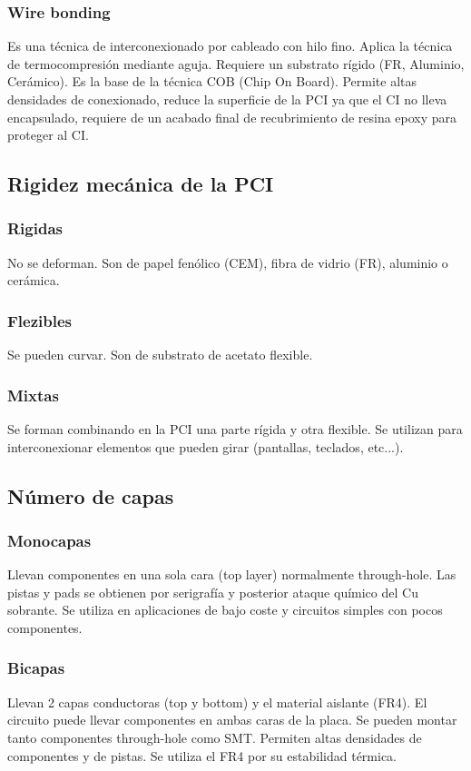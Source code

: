 \subsubsection{Wire bonding}
Es una técnica de interconexionado por cableado con hilo fino. Aplica la técnica de termocompresión mediante aguja. Requiere un substrato rígido (FR, Aluminio, Cerámico). Es la base de la técnica COB (Chip On Board). Permite altas densidades de conexionado, reduce la superficie de la PCI ya que el CI no lleva encapsulado, requiere de un acabado final de recubrimiento de resina epoxy para proteger al CI.

\subsection{Rigidez mecánica de la PCI}
\subsubsection{Rigidas}
No se deforman. Son de papel fenólico (CEM), fibra de vidrio (FR), aluminio o cerámica.

\subsubsection{Flezibles}
Se pueden curvar. Son de substrato de acetato flexible.

\subsubsection{Mixtas}
Se forman combinando en la PCI una parte rígida y otra flexible. Se utilizan para interconexionar elementos que pueden girar (pantallas, teclados, etc...).

\subsection{Número de capas}
\subsubsection{Monocapas}
Llevan componentes en una sola cara (top layer) normalmente through-hole. Las pistas y pads se obtienen por serigrafía y posterior ataque químico del Cu sobrante. Se utiliza en aplicaciones de bajo coste y circuitos simples con pocos componentes.

\subsubsection{Bicapas}
Llevan 2 capas conductoras (top y bottom) y el material aislante (FR4). El circuito puede llevar componentes en ambas caras de la placa. Se pueden montar tanto componentes through-hole como SMT. Permiten altas densidades de componentes y de pistas. Se utiliza el FR4 por su estabilidad térmica.

